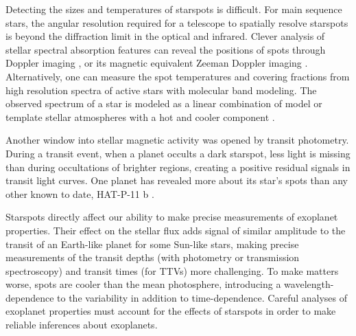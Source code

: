 Detecting the sizes and temperatures of starspots is difficult. For main sequence stars, the angular resolution required for a telescope to spatially resolve starspots is beyond the diffraction limit in the optical and infrared. Clever analysis of stellar spectral absorption features can reveal the positions of spots through Doppler imaging \citep{Vogt1983,Barnes2001,Strassmeier2002}, or its magnetic equivalent Zeeman Doppler imaging \citep{Donati2003,Morin2008,Morin2010,Morin2011,Morin2013}. Alternatively, one can measure the spot temperatures and covering fractions from high resolution spectra of active stars with molecular band modeling. The observed spectrum of a star is modeled as a linear combination of model or template stellar atmospheres with a hot and cooler component \citep{Neff1995,oneal1996,oneal1998,ONeal2004}. 

Another window into stellar magnetic activity was opened by \kepler transit photometry. During a transit event, when a planet occults a dark starspot, less light is missing than during occultations of brighter regions, creating a positive residual signals in transit light curves. One planet has revealed more about its star's spots than any other known to date, HAT-P-11 b \citep{Bakos2010,Winn2010,Deming2011,Sanchis-Ojeda2011,Hirano2011}. 

Starspots directly affect our ability to make precise measurements of exoplanet properties. Their effect on the stellar flux adds signal of similar amplitude to the transit of an Earth-like planet for some Sun-like stars, making precise measurements of the transit depths (with photometry or transmission spectroscopy) and transit times (for TTVs) more challenging. To make matters worse, spots are cooler than the mean photosphere, introducing a wavelength-dependence to the variability in addition to time-dependence. Careful analyses of exoplanet properties must account for the effects of starspots in order to make reliable inferences about exoplanets.

